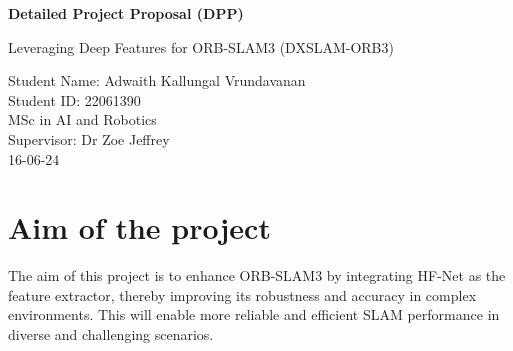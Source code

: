 \documentclass[a4paper,12pt]{article}
\begin{document}
\begin{titlepage}
    \centering
    \vspace*{1in}
    \Huge
    \textbf{Detailed Project Proposal (DPP)}

    \vspace{0.5in}
    \LARGE
    Leveraging Deep Features for ORB-SLAM3 (DXSLAM-ORB3)

    \vspace{1.5in}
    \large
    Student Name: Adwaith Kallungal Vrundavanan \\
    Student ID: 22061390\\
    MSc in AI and Robotics \\
    Supervisor: Dr Zoe Jeffrey \\
    16-06-24

    \vfill
\end{titlepage}

\section*{Aim of the project}
\begin{spacing}{1}
    The aim of this project is to enhance ORB-SLAM3 by integrating HF-Net as the feature extractor, thereby improving its robustness and accuracy in complex environments. This will enable more reliable and efficient SLAM performance in diverse and challenging scenarios.
\end{spacing}
\end{document}
